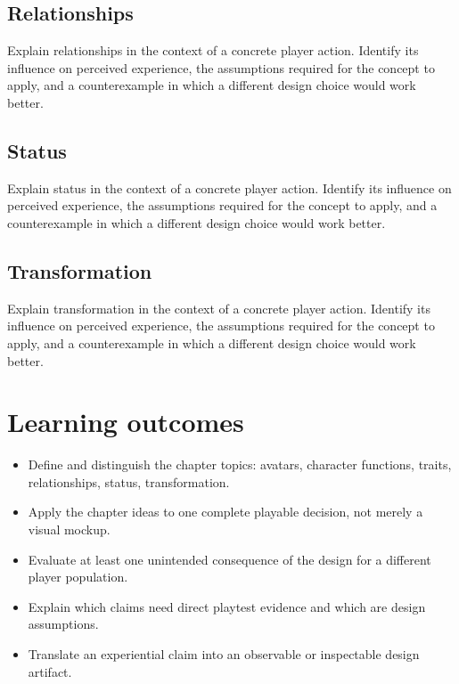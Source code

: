 \documentclass[11pt]{article}
\begin{document}
\subsection{Relationships}
Explain relationships in the context of a concrete player action. Identify its influence on perceived experience, the assumptions required for the concept to apply, and a counterexample in which a different design choice would work better.


\subsection{Status}
Explain status in the context of a concrete player action. Identify its influence on perceived experience, the assumptions required for the concept to apply, and a counterexample in which a different design choice would work better.


\subsection{Transformation}
Explain transformation in the context of a concrete player action. Identify its influence on perceived experience, the assumptions required for the concept to apply, and a counterexample in which a different design choice would work better.


\section{Learning outcomes}
\begin{itemize}
\item Define and distinguish the chapter topics: avatars, character functions, traits, relationships, status, transformation.
\item Apply the chapter ideas to one complete playable decision, not merely a visual mockup.
\item Evaluate at least one unintended consequence of the design for a different player population.
\item Explain which claims need direct playtest evidence and which are design assumptions.
\item Translate an experiential claim into an observable or inspectable design artifact.
\end{itemize}
\end{document}
